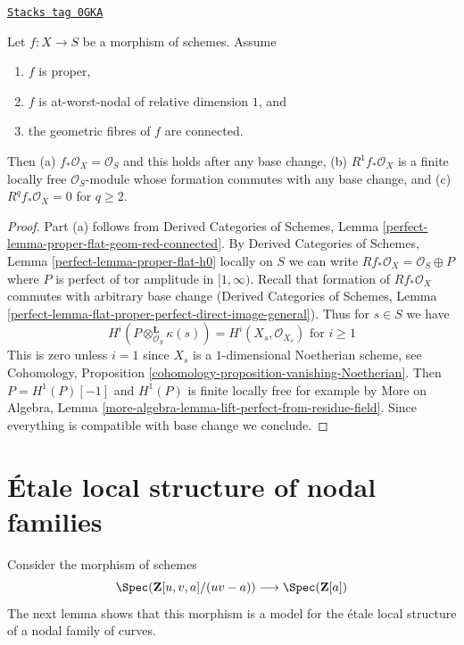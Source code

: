 \begin{lemma}
\label{curves-lemma-genus-in-nodal-family-of-curves}
\href{https://stacks.math.columbia.edu/tag/0GKA}{\texttt{Stacks tag 0GKA}}

Let $f : X \to S$ be a morphism of schemes. Assume
\begin{enumerate}
\item $f$ is proper,
\item $f$ is at-worst-nodal of relative dimension $1$, and
\item the geometric fibres of $f$ are connected.
\end{enumerate}
Then (a) $f_*\mathcal{O}_X = \mathcal{O}_S$ and this holds after
any base change, (b) $R^1f_*\mathcal{O}_X$ is a finite locally free
$\mathcal{O}_S$-module whose formation commutes with any base change,
and (c) $R^qf_*\mathcal{O}_X = 0$ for $q \geq 2$.
\end{lemma}

\begin{proof}
Part (a) follows from
Derived Categories of Schemes, Lemma
\ref{perfect-lemma-proper-flat-geom-red-connected}.
By Derived Categories of Schemes, Lemma
\ref{perfect-lemma-proper-flat-h0} locally on $S$
we can write $Rf_*\mathcal{O}_X = \mathcal{O}_S \oplus P$
where $P$ is perfect of tor amplitude in $[1, \infty)$.
Recall that formation of $Rf_*\mathcal{O}_X$ commutes
with arbitrary base change
(Derived Categories of Schemes, Lemma
\ref{perfect-lemma-flat-proper-perfect-direct-image-general}).
Thus for $s \in S$ we have
$$
H^i(P \otimes_{\mathcal{O}_S}^\mathbf{L} \kappa(s)) =
H^i(X_s, \mathcal{O}_{X_s})
\text{ for }i \geq 1
$$
This is zero unless $i = 1$ since $X_s$ is a $1$-dimensional
Noetherian scheme, see
Cohomology, Proposition \ref{cohomology-proposition-vanishing-Noetherian}.
Then $P = H^1(P)[-1]$ and $H^1(P)$ is finite locally free
for example by More on Algebra, Lemma
\ref{more-algebra-lemma-lift-perfect-from-residue-field}.
Since everything is compatible with base change we conclude.
\end{proof}

\section{\'Etale local structure of nodal families}
\label{curves-section-etale-local-nodal}
Consider the morphism of schemes
$$
\Spec(\mathbf{Z}[u, v, a]/(uv - a))
\longrightarrow
\Spec(\mathbf{Z}[a])
$$
The next lemma shows that this morphism is a model for
the \'etale local structure of a nodal family of curves.

